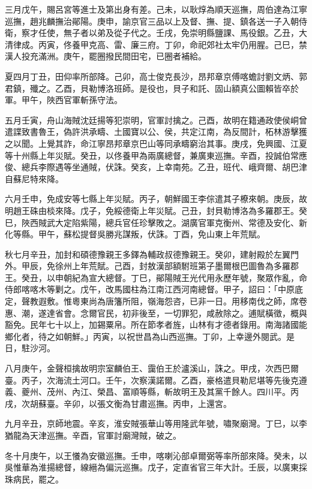 \begin{pinyinscope}
三月戊午，賜呂宮等進士及第出身有差。己未，以耿焞為順天巡撫，周伯達為江寧巡撫，趙兆麟撫治鄖陽。庚申，諭京官三品以上及督、撫、提、鎮各送一子入朝侍衛，察才任使，無子者以弟及從子代之。壬戌，免崇明縣鹽課、馬役銀。乙丑，大清律成。丙寅，佟養甲克高、雷、廉三府。丁卯，命祀郊社太牢仍用腥。己巳，禁漢人投充滿洲。庚午，罷圈撥民間田宅，已圈者補給。

夏四月丁丑，田仰率所部降。己卯，高士俊克長沙，昂邦章京傅喀蟾討劉文炳、郭君鎮，殲之。乙酉，貝勒博洛班師。是役也，貝子和託、固山額真公圖賴皆卒於軍。甲午，陜西官軍斬孫守法。

五月壬寅，舟山海賊沈廷揚等犯崇明，官軍討擒之。己酉，故明在籍通政使侯峒曾遣諜致書魯王，偽許洪承疇、土國寶以公、侯，共定江南，為反間計，柘林游擊獲之以聞。上覺其詐，命江寧昂邦章京巴山等同承疇窮治其事。庚戌，免興國、江夏等十州縣上年災賦。癸丑，以佟養甲為兩廣總督，兼廣東巡撫。辛酉，投誠伯常應俊、總兵李際遇等坐通賊，伏誅。癸亥，上幸南苑。乙丑，班代、峨齊爾、胡巴津自蘇尼特來降。

六月壬申，免成安等七縣上年災賦。丙子，朝鮮國王李倧遣其子橑來朝。庚辰，故明趙王硃由棪來降。戊子，免綏德衛上年災賦。己丑，封貝勒博洛為多羅郡王。癸巳，陜西賊武大定陷紫陽，總兵官任珍擊敗之。湖廣官軍克衡州、常德及安化、新化等縣。甲午，蘇松提督吳勝兆謀叛，伏誅。丁酉，免山東上年荒賦。

秋七月辛丑，加封和碩德豫親王多鐸為輔政叔德豫親王。癸卯，建射殿於左翼門外。甲辰，免徐州上年荒賦。己酉，封敖漢部額駙班第子墨爾根巴圖魯為多羅郡王。癸丑，以申朝紀為宣大總督。丁巳，鄖陽賊王光代用永歷年號，聚眾作亂，命侍郎喀喀木等剿之。戊午，改馬國柱為江南江西河南總督。甲子，詔曰：「中原底定，聲教遐敷。惟粵東尚為唐籓所阻，嶺海怨咨，已非一日。用移南伐之師，席卷惠、潮，遂達省會。念爾官民，初非後至，一切罪犯，咸赦除之。逋賦橫徵，概與豁免。民年七十以上，加錫粟帛。所在節孝者旌，山林有才德者錄用。南海諸國能鄉化者，待之如朝鮮。」丙寅，以祝世昌為山西巡撫。丁卯，上幸邊外閱武。是日，駐沙河。

八月庚午，金聲桓擒故明宗室麟伯王、靄伯王於瀘溪山，誅之。甲戌，次西巴爾臺。丙子，次海流土河口。壬午，次察漢諾爾。乙酉，豪格遣貝勒尼堪等先後克遵義、夔州、茂州、內江、榮昌、富順等縣，斬故明王及其黨千餘人。四川平。丙戌，次胡蘇臺。辛卯，以張文衡為甘肅巡撫。丙申，上還宮。

九月辛丑，京師地震。辛亥，淮安賊張華山等用隆武年號，嘯聚廟灣。丁巳，以李猶龍為天津巡撫。辛酉，官軍討廟灣賊，破之。

冬十月庚午，以王懩為安徽巡撫。壬申，喀喇沁部卓爾弼等率所部來降。癸未，以吳惟華為淮揚總督，線縉為偏沅巡撫。戊子，定直省官三年大計。壬辰，以廣東採珠病民，罷之。


\end{pinyinscope}
